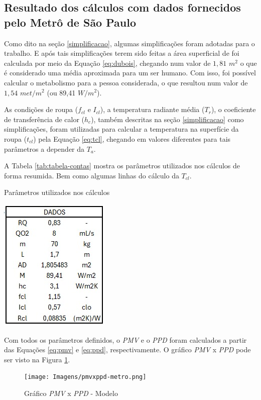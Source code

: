 \documentclass[acronym,symbols,table]{fei}
\begin{document}
\subsection{Resultado dos cálculos com dados fornecidos pelo Metrô de São Paulo}
Como dito na seção \ref{simplificacao}, algumas simplificações foram adotadas para o trabalho. E após tais simplificações terem sido feitas a área superficial de \textcite{dubois1916formula} foi calculada por meio da Equação \ref{eq:dubois}, chegando num valor de $1,81$ $m^2$ o que é considerado uma média aproximada para um ser humano. Com isso, foi possível calcular o metabolismo para a pessoa considerada, o que resultou num valor de $1,54$ $met/m^2$ (ou 89,41 $W/m^2$).

As condições de roupa ($f_{cl}$ e $I_{cl}$), a temperatura radiante média ($T_{r}$), o coeficiente de transferência de calor ($h_{c}$), também descritas na seção \ref{simplificacao} como simplificações, foram utilizadas para calcular a temperatura na superfície da roupa ($t_{cl}$) pela Equação \ref{eq:tcl}, chegando em valores diferentes para tais parâmetros a depender da $T_{a}$. 

A Tabela \ref{tab:tabela-contas} mostra os parâmetros utilizados nos cálculos de forma resumida. Bem como algumas linhas do cálculo da $T_{cl}$.

\begin{table}[!htb]
 \centering
    \caption{Parâmetros utilizados nos cálculos}
    \includegraphics[width=0.3\linewidth]{Tabelas/tabela-contas.jpeg}
    \label{tab:tabela-contas}
\end{table}


Com todos os parâmetros definidos, o \textit{PMV} e o \textit{PPD} foram calculados a partir das Equações \ref{eq:pmv} e \ref{eq:ppd}, respectivamente. O gráfico \textit{PMV} x \textit{PPD} pode ser visto na Figura \ref{fig:pmv-ppd-metro}.

\begin{figure}[!htb]
    \centering
    \caption{Gráfico \textit{PMV} x \textit{PPD} - Modelo}
    \texttt{[image: Imagens/pmvxppd-metro.png]}
    \label{fig:pmv-ppd-metro}
\end{figure}
\end{document}
